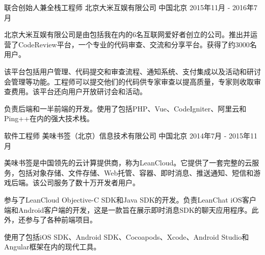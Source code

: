 \begin{cventries}
\cventry
{联合创始人兼全栈工程师} %
{北京大米互娱有限公司} %
{中国北京} %
{2015年11月 - 2016年7月} %
{
  \begin{cvitems} %
    \item {北京大米互娱有限公司是由包括我在内的6名互联网爱好者创立的公司。推出并运营了CodeReview平台，一个专业的代码审查、交流和分享平台。获得了约3000名用户。}
    \item {该平台包括用户管理、代码提交和审查流程、通知系统、支付集成以及活动和研讨会管理等功能。工程师可以提交他们的代码供专家审查以提高质量，专家则收取审查费用。该平台还向用户开放研讨会和活动。}
    \item {负责后端和一半前端的开发。使用了包括PHP、Vue、CodeIgniter、阿里云和Ping++在内的强大技术栈。}
  \end{cvitems}
}

\cventry
{软件工程师} %
{美味书签（北京）信息技术有限公司} %
{中国北京} %
{2014年7月 - 2015年11月} %
{
  \begin{cvitems} %
    \item {美味书签是中国领先的云计算提供商，称为LeanCloud。它提供了一套完整的云服务，包括对象存储、文件存储、Web托管、容器、即时消息、推送通知、短信和游戏后端。该公司服务了数十万开发者用户。}
    \item {参与了LeanCloud Objective-C SDK和Java SDK的开发。负责LeanChat iOS客户端和Android客户端的开发，这是一款旨在展示即时消息SDK的聊天应用程序。此外，还参与了各种前端项目。}
    \item {使用了包括iOS SDK、Android SDK、Cocoapods、Xcode、Android Studio和Angular框架在内的现代工具。}
  \end{cvitems}
}

\end{cventries}